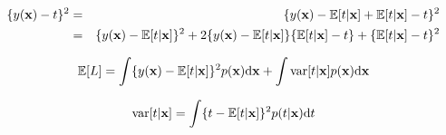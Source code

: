 \begin{eqnarray}
\nonumber \{y({\bf x})-t\}^2 &=& \{y({\bf x}) - \mathbb{E}[t|{\bf x}] + \mathbb{E}[t|{\bf x}] - t\}^2 \\
\nonumber  &=& \{y({\bf x}) - \mathbb{E}[t|{\bf x}]\}^2 + 2\{y({\bf x}) - \mathbb{E}[t|{\bf x}]\}\{\mathbb{E}[t|{\bf x}] - t\} + \{\mathbb{E}[t|{\bf x}] - t\}^2
\end{eqnarray}

\begin{equation}
\nonumber \mathbb{E}[L] = \int \{y({\bf x}) - \mathbb{E}[t | {\bf x}]\}^2 p({\bf x}){\rm d}{\bf x} + \int {\rm var}[t | {\bf x}]p({\bf x}){\rm d}{\bf x}
\end{equation}

\begin{equation}
\nonumber {\rm var}[t | {\bf x}] = \int \{t - \mathbb{E}[t | {\bf x}]\}^2 p(t | {\bf x}){\rm d}t
\end{equation}
